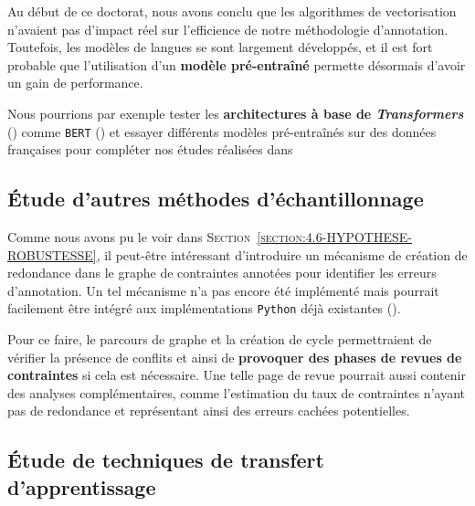 		Au début de ce doctorat, nous avons conclu que les algorithmes de vectorisation n'avaient pas d'impact réel sur l'efficience de notre méthodologie d'annotation.
		Toutefois, les modèles de langues se sont largement développés, et il est fort probable que l'utilisation d'un \textbf{modèle pré-entraîné} permette désormais d'avoir un gain de performance.
		
		Nous pourrions par exemple tester les \textbf{architectures à base de \textit{Transformers}} (\cite{uszkoreit:2017:transformer-novel-neural}) comme \texttt{BERT} (\cite{devlin-etal:2019:bert-pretraining-deep}) et essayer différents modèles pré-entraînés sur des données françaises pour compléter nos études réalisées dans \cite{schild:2021:cognitivefactory-interactiveclusteringcomparativestudy}
	
	
	\subsection{Étude d'autres méthodes d'échantillonnage}
	\label{section:4.7.3-HYPOTHESES-NON-VERIFIEES-ECHANTILLONNAGE}
	
		Comme nous avons pu le voir dans \textsc{Section~\ref{section:4.6-HYPOTHESE-ROBUSTESSE}}, il peut-être intéressant d'introduire un mécanisme de création de redondance dans le graphe de contraintes annotées pour identifier les erreurs d'annotation.
		Un tel mécanisme n'a pas encore été implémenté mais pourrait facilement être intégré aux implémentations \texttt{Python} déjà existantes (\cite{schild:2022:cognitivefactory-interactiveclustering}).
		
		Pour ce faire, le parcours de graphe et la création de cycle permettraient de vérifier la présence de conflits et ainsi de \textbf{provoquer des phases de revues de contraintes} si cela est nécessaire.
		Une telle page de revue pourrait aussi contenir des analyses complémentaires, comme l'estimation du taux de contraintes n'ayant pas de redondance et représentant ainsi des erreurs cachées potentielles.
	
	
	\subsection{Étude de techniques de transfert d'apprentissage}
	\label{section:4.7.4-HYPOTHESES-NON-VERIFIEES-TRANSFERT-APPRENTISSAGE}
	
